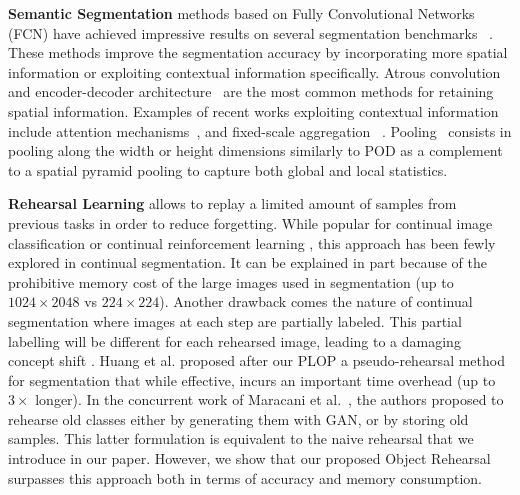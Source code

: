 \noindent\textbf{Semantic Segmentation} methods based on Fully Convolutional Networks (FCN)
\cite{long2015fcn,sermanet2014overfeat} have achieved impressive results on several segmentation
benchmarks ~\cite{everingham2015pascalvoc,
    cordts2016cityscapes,zhou2017adedataset,caesar2018cocoostuff}. These methods improve the
segmentation accuracy by incorporating more spatial information or exploiting contextual information
specifically. Atrous convolution~\cite{chen2018deeplab,mehta2018espnet} and encoder-decoder
architecture~\cite{ronneberger2015UNet,noh2015deconvolution,badrinarayanan2017segnet} are the most
common methods for retaining spatial information. Examples of recent works exploiting contextual
information include attention
mechanisms~\cite{yuan2018ocnet,zhao2018psanet,fu2019DANet,huang2019CCNet,yuan2020ocr,tao2020HRNet,zhang2020resnest},
and fixed-scale aggregation
~\cite{zhao2017PSPNet,chen2018deeplab,chen2018ZPSA,zhang2018ContextEncoding}. %
Pooling~\cite{hou2020strippooling} consists in pooling along the width or height dimensions
similarly to POD \cite{douillard2020podnet} as a complement to a spatial pyramid pooling
\cite{he2014spatialpyramidpooling} to capture both global and local statistics.

\noindent\textbf{Rehearsal Learning} \cite{robins1995catastrophicforgetting} allows to replay a
limited amount of samples from previous tasks in order to reduce forgetting. While popular for
continual image classification
\cite{rebuffi2017icarl,castro2018end_to_end_inc_learn,chaudhry2019tinyepisodicmemories,hayes2020remind,iscen2020incrementalfeatureadaptation,kemker2018fearnet,shin2017deep_generative_replay,liu2020mnemonics,chaudhry2019tinyepisodicmemories}
or continual reinforcement learning \cite{traore2019discorl}, this approach has been fewly explored
in continual segmentation. It can be explained in part because of the prohibitive memory cost of the
large images used in segmentation (up to $1024 \times 2048$ vs $224 \times 224$). Another drawback
comes the nature of continual segmentation where images at each step are partially labeled. This
partial labelling will be different for each rehearsed image, leading to a damaging concept shift
\cite{morenotorresa2012datasetshift,lesort2021driftanalysis}. Huang et al.
\cite{huang2021halfrealhalffake} proposed after our PLOP a pseudo-rehearsal method for segmentation
that while effective, incurs an important time overhead (up to $3\times$ longer). In the concurrent
work of Maracani et al.~\cite{maracani2021recall}, the authors proposed to rehearse old classes
either by generating them with \acs{GAN}, or by storing old samples. This latter formulation is
equivalent to the naive rehearsal that we introduce in our paper. However, we show that our proposed
Object Rehearsal surpasses this approach both in terms of accuracy and memory consumption.

